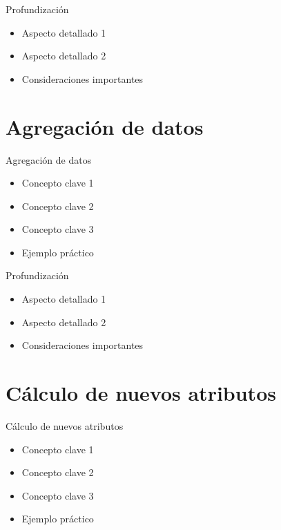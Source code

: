 \documentclass[10pt]{beamer}
\begin{document}
\begin{frame}{Profundización}
    \begin{itemize}
        \item Aspecto detallado 1
        \item Aspecto detallado 2
        \item Consideraciones importantes
    \end{itemize}
\end{frame}

\section{Agregación de datos}

\begin{frame}{Agregación de datos}
    \begin{itemize}
        \item Concepto clave 1
        \item Concepto clave 2
        \item Concepto clave 3
        \item Ejemplo práctico
    \end{itemize}
\end{frame}

\begin{frame}{Profundización}
    \begin{itemize}
        \item Aspecto detallado 1
        \item Aspecto detallado 2
        \item Consideraciones importantes
    \end{itemize}
\end{frame}

\section{Cálculo de nuevos atributos}

\begin{frame}{Cálculo de nuevos atributos}
    \begin{itemize}
        \item Concepto clave 1
        \item Concepto clave 2
        \item Concepto clave 3
        \item Ejemplo práctico
    \end{itemize}
\end{frame}
\end{document}
